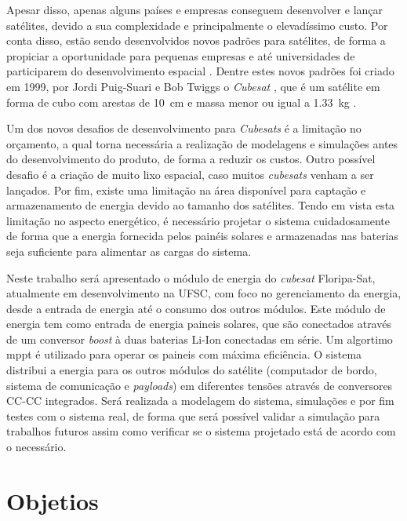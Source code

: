 Apesar disso, apenas alguns países e empresas conseguem desenvolver e lançar satélites, devido a sua complexidade e principalmente o elevadíssimo custo. Por conta disso, estão sendo desenvolvidos novos padrões para satélites, de forma a propiciar a oportunidade para pequenas empresas e até universidades de participarem do desenvolvimento espacial \cite{Baker2008}. Dentre estes novos padrões foi criado em 1999, por Jordi Puig-Suari e Bob Twiggs o \textit{Cubesat} \cite{Messier2015}, que é um satélite em forma de cubo com arestas de \SI{10}{\centi\metre} e massa menor ou igual a \SI{1.33}{\kilo\gram} \cite{cubesatDesignSpecification2014}.

Um dos novos desafios de desenvolvimento para \textit{Cubesats} é a limitação no orçamento, a qual torna necessária a realização de modelagens e simulações antes do desenvolvimento do produto, de forma a reduzir os custos. Outro possível desafio é a criação de muito lixo espacial, caso muitos \textit{cubesats} venham a ser lançados. Por fim, existe uma limitação na área disponível para captação e armazenamento de energia devido ao tamanho dos satélites\cite{Kalman2011}. Tendo em vista esta limitação no aspecto energético, é necessário projetar o sistema cuidadosamente de forma que a energia fornecida pelos painéis solares e armazenadas nas baterias seja suficiente para alimentar as cargas do sistema.

Neste trabalho será apresentado o módulo de energia do \textit{cubesat} Floripa-Sat, atualmente em desenvolvimento na UFSC, com foco no gerenciamento da energia, desde a entrada de energia até o consumo dos outros módulos. Este módulo de energia tem como entrada de energia paineis solares, que são conectados através de um conversor \textit{boost} à duas baterias Li-Ion conectadas em série. Um algortimo \gls{mppt} é utilizado para operar os paineis com máxima eficiência. O sistema distribui a energia para os outros módulos do satélite (computador de bordo, sistema de comunicação e \textit{payloads}) em diferentes tensões através de conversores CC-CC integrados. Será realizada a modelagem do sistema, simulações e por fim testes com o sistema real, de forma que será possível validar a simulação para trabalhos futuros assim como verificar se o sistema projetado está de acordo com o necessário.

\section{Objetios}

